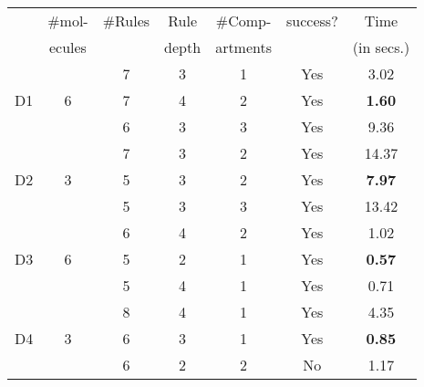 \begin{table}[t]
  \centering
  \tiny
  \begin{minipage}{0.48\linewidth}
  \begin{tabular}[t]{|c|c|c|c|c|c|c|}\hline
     & \#mol- & \#Rules & Rule  & \#Comp- & success? & Time \\
         & ecules   &         & depth & artments &          & (in secs.) \\\hline
         &   & 7  & 3 & 1 & Yes &  3.02 \\\cline{3-7}
    D1   & 6 & 7  & 4 & 2 & Yes & {\bf 1.60}  \\\cline{3-7}
         &   & 6  & 3 & 3 & Yes & 9.36  \\\hline
         
         &   & 7  & 3 & 2 & Yes & 14.37  \\\cline{3-7}
    D2   & 3 & 5  & 3 & 2 & Yes & {\bf 7.97}  \\\cline{3-7}
         &   & 5  & 3 & 3 & Yes  &  13.42 \\\hline
         
         &   & 6  & 4  & 2  & Yes & 1.02  \\\cline{3-7}
    D3   & 6 & 5  & 2 & 1 & Yes & {\bf 0.57}  \\\cline{3-7}
         &   & 5  & 4 & 1 & Yes  &  0.71 \\\hline
         
         &   & 8  & 4  & 1  & Yes & 4.35  \\\cline{3-7}
    D4   & 3 & 6  & 3 & 1 & Yes & {\bf 0.85}  \\\cline{3-7}
         &   & 6  & 2 & 2 & No  &  1.17 \\\hline
         
         
  \end{tabular}    
  \end{minipage}
  \begin{minipage}{0.48\linewidth}


\end{minipage}
\end{table}
